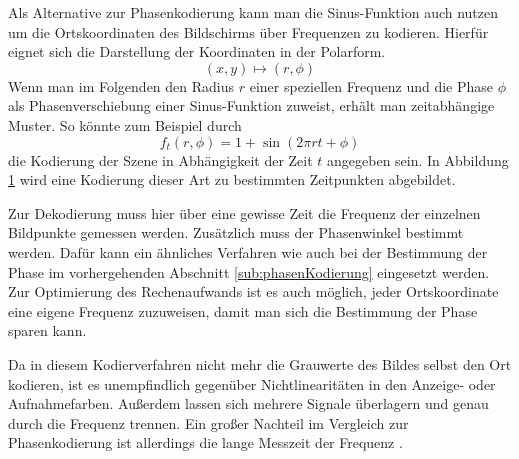 Als Alternative zur Phasenkodierung kann man die Sinus-Funktion auch nutzen um die Ortskoordinaten des Bildschirms über Frequenzen zu kodieren.
Hierfür eignet sich die Darstellung der Koordinaten in der Polarform.
%
\begin{equation*}
	\left(x,y\right) \mapsto \left(r,\phi\right)
\end{equation*}
%
Wenn man im Folgenden den Radius $r$ einer speziellen Frequenz und die Phase $\phi$ als Phasenverschiebung einer Sinus-Funktion zuweist, erhält man zeitabhängige Muster.
So könnte zum Beispiel durch
%
\begin{equation*}
	f_t \left(r,\phi\right) = 1 + \sin \left(2 \pi r t + \phi \right)
\end{equation*}
%
die Kodierung der Szene in Abhängigkeit der Zeit $t$ angegeben sein.
In Abbildung \ref{tikz:abbFrequenzkodierteMuster} wird eine Kodierung dieser Art zu bestimmten Zeitpunkten abgebildet.
%
\begin{figure}[H]
	\centering
	
	\label{tikz:abbFrequenzkodierteMuster}
\end{figure}
%
\noindent
Zur Dekodierung muss hier über eine gewisse Zeit die Frequenz der einzelnen Bildpunkte gemessen werden.
Zusätzlich muss der Phasenwinkel bestimmt werden.
Dafür kann ein ähnliches Verfahren wie auch bei der Bestimmung der Phase im vorhergehenden Abschnitt \ref{sub:phasenKodierung} eingesetzt werden.
Zur Optimierung des Rechenaufwands ist es auch möglich, jeder Ortskoordinate eine eigene Frequenz zuzuweisen, damit man sich die Bestimmung der Phase sparen kann.

\p
Da in diesem Kodierverfahren nicht mehr die Grauwerte des Bildes selbst den Ort kodieren, ist es unempfindlich gegenüber Nichtlinearitäten in den Anzeige- oder Aufnahmefarben.
Außerdem lassen sich mehrere Signale überlagern und genau durch die Frequenz trennen.
Ein großer Nachteil im Vergleich zur Phasenkodierung ist allerdings die lange Messzeit der Frequenz \cite{jenaerOK}.